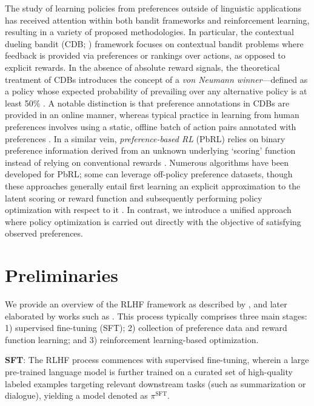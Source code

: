The study of learning policies from preferences outside of linguistic applications has received attention within both bandit frameworks and reinforcement learning, resulting in a variety of proposed methodologies. In particular, the contextual dueling bandit (CDB; \cite{yue2012karmed,dudik2015contextual}) framework focuses on contextual bandit problems where feedback is provided via preferences or rankings over actions, as opposed to explicit rewards. In the absence of absolute reward signals, the theoretical treatment of CDBs introduces the concept of a \textit{von Neumann winner}—defined as a policy whose expected probability of prevailing over any alternative policy is at least 50\% \citep{dudik2015contextual}. A notable distinction is that preference annotations in CDBs are provided in an online manner, whereas typical practice in learning from human preferences involves using a static, offline batch of action pairs annotated with preferences \citep{yan2022human}. In a similar vein, \textit{preference-based RL} (PbRL) relies on binary preference information derived from an unknown underlying ‘scoring’ function instead of relying on conventional rewards \citep{BusaFekete2014,ruiz2023dueling}. Numerous algorithms have been developed for PbRL; some can leverage off-policy preference datasets, though these approaches generally entail first learning an explicit approximation to the latent scoring or reward function and subsequently performing policy optimization with respect to it \citep{jain2013learning,BusaFekete2014,christiano2017deep,sadigh2017active,kupcsik2018learning}. In contrast, we introduce a unified approach where policy optimization is carried out directly with the objective of satisfying observed preferences.

\section{Preliminaries}\label{section:prelims}

We provide an overview of the RLHF framework as described by \citeauthor{ziegler2020finetuning}, and later elaborated by works such as \citep{stiennon2022learning, bai2022training, ouyang2022training}. This process typically comprises three main stages: 1) supervised fine-tuning (SFT); 2) collection of preference data and reward function learning; and 3) reinforcement learning-based optimization.

\textbf{SFT}: The RLHF process commences with supervised fine-tuning, wherein a large pre-trained language model is further trained on a curated set of high-quality labeled examples targeting relevant downstream tasks (such as summarization or dialogue), yielding a model denoted as $\pi^\text{SFT}$.

